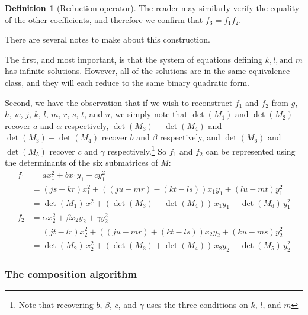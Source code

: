 \documentclass{article}
\theoremstyle{definition}
\newtheorem{definition}{Definition}[section]
\theoremstyle{theorem}
\theoremstyle{example}
\theoremstyle{corollary}
\begin{document}
\begin{definition}[Reduction operator]
\bigskip

The reader may similarly verify the equality of the other coefficients, and therefore we confirm that \(f_{3} = f_{1} f_{2}\).

\bigskip

There are several notes to make about this construction.

\bigskip

The first, and most important, is that the system of equations defining \(k, l, \textrm{and } m\) has infinite solutions. However, all of the solutions are in the same equivalence class, and they will each reduce to the same binary quadratic form.
\bigskip

Second, we have the observation that if we wish to reconstruct \(f_{1}\) and \(f_{2}\) from \(g\), \(h\), \(w\), \(j\), \(k\), \(l\), \(m\), \(r\), \(s\), \(t\), and \(u\), we simply note that \(\det(M_{1})\) and \(\det(M_{2})\) recover \(a\) and \(\alpha\) respectively, \(\det(M_{3}) - \det(M_{4})\) and \(\det(M_{3}) + \det(M_{4})\) recover \(b\) and \(\beta\) respectively, and \(\det(M_{6})\) and \(\det(M_{5})\) recover \(c\) and \(\gamma\) respectively.\footnote{Note that recovering \(b\), \(\beta\), \(c\), and \(\gamma\) uses the three conditions on \(k\), \(l\), and \(m\)} So \(f_{1}\) and \(f_{2}\) can be represented using the determinants of the six submatrices of \(M\):
\begin{align*}
f_{1} &= a x_{1}^{2} + b x_{1} y_{1} + c y_{1}^{2} \\
&= (j s - k r) x_{1}^{2} + ( (j u - m r) - (k t - l s) ) x_{1} y_{1} + (l u - m t) y_{1}^{2} \\
&= \det(M_{1})\, x_{1}^{2} + ( \det(M_{3}) - \det(M_{4}) )\, x_{1} y_{1} + \det(M_{6})\, y_{1}^{2} \\
f_{2} &= \alpha x_{2}^{2} + \beta x_{2} y_{2} + \gamma y_{2}^{2} \\
&= (j t - l r) x_{2}^{2} + ( (j u - m r) + (k t - l s) ) x_{2} y_{2} + (k u - m s) y_{2}^{2} \\
&= \det(M_{2})\, x_{2}^{2} + ( \det(M_{3}) + \det(M_{4}) )\, x_{2} y_{2} + \det(M_{5})\, y_{2}^{2}
\end{align*}

\bigskip

\subsubsection{The composition algorithm}

\bigskip


\end{definition}
\end{document}
